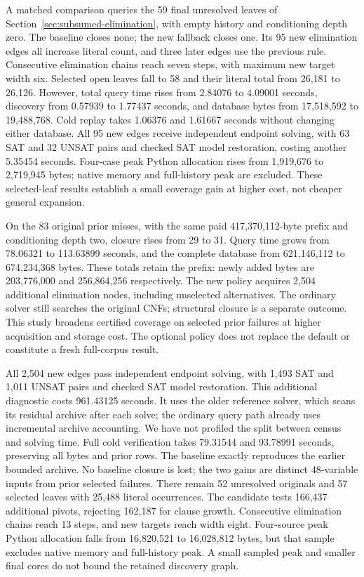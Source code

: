 \documentclass[11pt,a4paper]{article}
\numberwithin{equation}{section}
\theoremstyle{plain}
\theoremstyle{definition}
\theoremstyle{remark}
\begin{document}
A matched comparison queries the 59 final unresolved leaves of Section~\ref{sec:subsumed-elimination}, with empty history and conditioning depth zero. The baseline closes none; the new fallback closes one. Its 95 new elimination edges all increase literal count, and three later edges use the previous rule. Consecutive elimination chains reach seven steps, with maximum new target width six. Selected open leaves fall to 58 and their literal total from 26,181 to 26,126. However, total query time rises from 2.84076 to 4.09001 seconds, discovery from 0.57939 to 1.77437 seconds, and database bytes from 17,518,592 to 19,488,768. Cold replay takes 1.06376 and 1.61667 seconds without changing either database. All 95 new edges receive independent endpoint solving, with 63 SAT and 32 UNSAT pairs and checked SAT model restoration, costing another 5.35454 seconds. Four-case peak Python allocation rises from 1,919,676 to 2,719,945 bytes; native memory and full-history peak are excluded. These selected-leaf results establish a small coverage gain at higher cost, not cheaper general expansion.

On the 83 original prior misses, with the same paid 417,370,112-byte prefix and conditioning depth two, closure rises from 29 to 31. Query time grows from 78.06321 to 113.63899 seconds, and the complete database from 621,146,112 to 674,234,368 bytes. These totals retain the prefix: newly added bytes are 203,776,000 and 256,864,256 respectively. The new policy acquires 2,504 additional elimination nodes, including unselected alternatives. The ordinary solver still searches the original CNFs; structural closure is a separate outcome. This study broadens certified coverage on selected prior failures at higher acquisition and storage cost. The optional policy does not replace the default or constitute a fresh full-corpus result.

All 2,504 new edges pass independent endpoint solving, with 1,493 SAT and 1,011 UNSAT pairs and checked SAT model restoration. This additional diagnostic costs 961.43125 seconds. It uses the older reference solver, which scans its residual archive after each solve; the ordinary query path already uses incremental archive accounting. We have not profiled the split between census and solving time. Full cold verification takes 79.31544 and 93.78991 seconds, preserving all bytes and prior rows. The baseline exactly reproduces the earlier bounded archive. No baseline closure is lost; the two gains are distinct 48-variable inputs from prior selected failures. There remain 52 unresolved originals and 57 selected leaves with 25,488 literal occurrences. The candidate tests 166,437 additional pivots, rejecting 162,187 for clause growth. Consecutive elimination chains reach 13 steps, and new targets reach width eight. Four-source peak Python allocation falls from 16,820,521 to 16,028,812 bytes, but that sample excludes native memory and full-history peak. A small sampled peak and smaller final cores do not bound the retained discovery graph.
\end{document}

